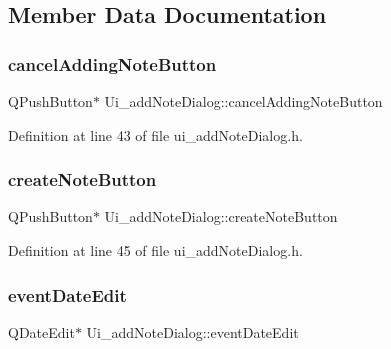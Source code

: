 \subsection{Member Data Documentation}
\hypertarget{classUi__addNoteDialog_a600ac0c5310ee52416b8fa3ff1e1142e}{}\label{classUi__addNoteDialog_a600ac0c5310ee52416b8fa3ff1e1142e} 
\subsubsection{\texorpdfstring{cancel\+Adding\+Note\+Button}{cancelAddingNoteButton}}
{\footnotesize\ttfamily Q\+Push\+Button$\ast$ Ui\+\_\+add\+Note\+Dialog\+::cancel\+Adding\+Note\+Button}



Definition at line 43 of file ui\+\_\+add\+Note\+Dialog.\+h.

\hypertarget{classUi__addNoteDialog_a095d7b7256d2a2449943e7c4f0afa209}{}\label{classUi__addNoteDialog_a095d7b7256d2a2449943e7c4f0afa209} 
\subsubsection{\texorpdfstring{create\+Note\+Button}{createNoteButton}}
{\footnotesize\ttfamily Q\+Push\+Button$\ast$ Ui\+\_\+add\+Note\+Dialog\+::create\+Note\+Button}



Definition at line 45 of file ui\+\_\+add\+Note\+Dialog.\+h.

\hypertarget{classUi__addNoteDialog_adb9af8a9610aaea19686f07c381095a4}{}\label{classUi__addNoteDialog_adb9af8a9610aaea19686f07c381095a4} 
\subsubsection{\texorpdfstring{event\+Date\+Edit}{eventDateEdit}}
{\footnotesize\ttfamily Q\+Date\+Edit$\ast$ Ui\+\_\+add\+Note\+Dialog\+::event\+Date\+Edit}



